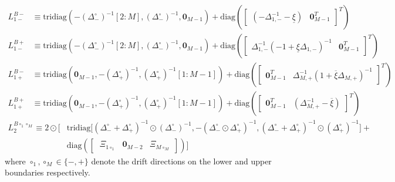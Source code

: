 \documentclass[11pt]{article}
\newcommand{\tridiag}{\ensuremath{\mathrm{tridiag}}}
\newcommand{\diag}{\ensuremath{\mathrm{diag}}}
\theoremstyle{definition}
\begin{document}
\begin{align}
{L}_{1-}^{B-} &\equiv
\tridiag \left(-(\Delta_-^\circ)^{-1}[2:M], (\Delta_-^\circ )^{-1}, \mathbf{0}_{M-1}  \right) +
\diag\left( 
\begin{bmatrix}
(-\Delta^{-1}_{1,-} - \underline{\xi} ) &
\mathbf{0}_{M-1}^T
\end{bmatrix}^T
\right) \\
{L}_{1-}^{B+} &\equiv
\tridiag \left(-(\Delta_-^\circ)^{-1}[2:M], (\Delta_-^\circ )^{-1}, \mathbf{0}_{M-1}  \right) +
\diag\left( 
\begin{bmatrix}
\Delta^{-1}_{1,-} (-1 + \underline{\xi} \Delta_{1,-})^{-1} &
\mathbf{0}_{M-1}^T
\end{bmatrix}^T
\right)
\end{align}
\begin{align}
{L}_{1+}^{B-} &\equiv
\tridiag \left(\mathbf{0}_{M-1}, -(\Delta_+^\circ )^{-1}, (\Delta_+^\circ)^{-1}[1:M-1]  \right) +
\diag\left( 
\begin{bmatrix}
\mathbf{0}_{M-1}^T &
\Delta^{-1}_{M,+} (1 + \overline{\xi} \Delta_{M,+})^{-1}
\end{bmatrix}^T
\right) \\
{L}_{1+}^{B+} &\equiv
\tridiag \left(\mathbf{0}_{M-1}, -(\Delta_+^\circ )^{-1}, (\Delta_+^\circ)^{-1}[1:M-1]  \right) +
\diag\left( 
\begin{bmatrix}
\mathbf{0}_{M-1}^T &
(\Delta^{-1}_{M,+} - \overline{\xi})
\end{bmatrix}^T
\right) 
\end{align}
\begin{align}
{L}_{2}^{B \circ_1 \circ_M } \equiv
2 \odot \Big[ & \text{tridiag} \Big[(\Delta_-^\circ + \Delta_+^\circ)^{-1} \odot (\Delta_{-}^\circ)^{-1}, 
-(\Delta_-^\circ \odot \Delta_+^\circ)^{-1},
(\Delta_-^\circ + \Delta_+^\circ)^{-1} \odot (\Delta_{+}^\circ)^{-1} \Big] + \\ & \diag\left(  
\begin{bmatrix} \
\Xi_{1 \circ_1} & \mathbf{0}_{M-2} & \Xi_{M \circ_M}
\end{bmatrix}
\right) \Big]
\end{align}
where $\circ_1, \circ_M \in \{-, +\}$ denote the drift directions on the lower and upper boundaries respectively.
\end{document}
